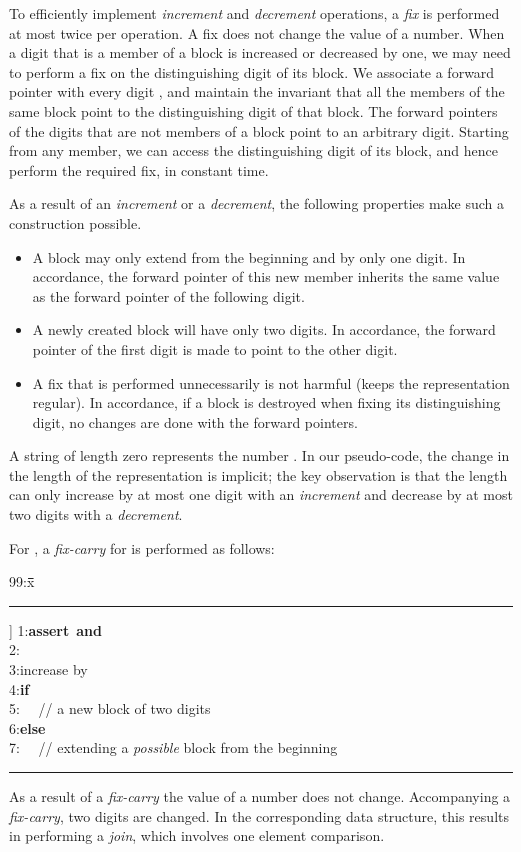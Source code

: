 \documentclass{llncs}
\newenvironment{algorithm}{\par\vspace*{-2mm}\quad\begin{minipage}[t]{0.925\textwidth}\begin{tabbing}99:x\=\quad\=\quad\=\quad\=\quad\=\quad\=\kill}{\end{tabbing}\end{minipage}\par\vspace*{-3mm}}
\newcommand{\ASSERT}{\textbf{assert}\ }
\newcommand{\IF}{\textbf{if}\ }
\newcommand{\ELSE}{\textbf{else}\ }
\newcommand{\AND}{\textbf{and}\ }
\begin{document}
To efficiently implement \emph{increment} and \emph{decrement} operations, a
\emph{fix} is performed at most twice per operation.  A fix does not
change the value of a number.  When a digit that is a member of a
block is increased or decreased by one, we may need to perform a fix
on the distinguishing digit of its block.  We associate a forward
pointer  with every digit , and maintain the invariant that
all the members of the same block point to the distinguishing digit of
that block. The forward pointers of the digits that are not members of 
a block point to an arbitrary digit.  Starting from any member, 
we can access the distinguishing digit of its block, 
and hence perform the required fix, in constant time.
 
As a result of an \emph{increment} or a \emph{decrement}, the 
following properties make such a construction possible.
\begin{itemize}
\vspace{-.1in}
\item A block may only extend from the beginning and by only one digit.
In accordance, the forward pointer of this new member inherits the same value as the forward pointer of the following digit.
\item A newly created block will have only two digits.
In accordance, the forward pointer of the first digit is made to point to the other digit.
\item A fix that is performed unnecessarily is not harmful (keeps the representation regular). 
In accordance, if a block is destroyed when fixing its distinguishing digit, no changes are done with the forward pointers.
\vspace{-.1in}
\end{itemize}
A string of length zero represents the number . In our pseudo-code,
the change in the length of the representation is implicit; 
the key observation is that the length can only increase by at most one digit 
with an \emph{increment} and decrease by at most two digits with a \emph{decrement}. 

For , a \emph{fix-carry} for  is performed as follows: 
\begin{center}
\begin{algorithm}
\rule[6pt]{\textwidth}{0.45pt}\-6pt]
1:\>\ASSERT  \AND \\
2:\>\\
3:\>increase  by \\
4:\>\IF \\ 
5:\>\>  ~~// a new block of two digits\\
6:\>\ELSE\\
7:\>\> ~~// extending a \emph{possible} block from the beginning\\ 
\rule[6pt]{\textwidth}{0.45pt}
\end{algorithm}
\end{center}
As a result of a {\it fix-carry} the value of a number does not change.
Accompanying a {\it fix-carry}, two digits are changed. In the corresponding
data structure, this results in performing a \emph{join}, which
involves one element comparison.
\end{document}
